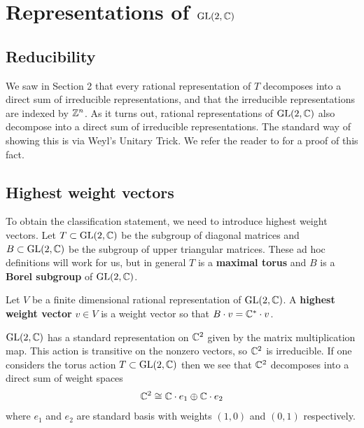 \documentclass[12pt]{article}
\begin{document}
\section{Representations of $\operatorname{GL}(2,\mathbb{C})$}

\subsection{Reducibility}
We saw in Section 2 that every rational representation of $T$ decomposes into a direct sum of irreducible representations,
and that the irreducible representations are indexed by $\mathbb{Z}^n$. As it turns out, rational representations of $\operatorname{GL}(2,\mathbb{C})$
also decompose into a direct sum of irreducible representations. The standard way of showing this is via 
Weyl's Unitary Trick. We refer the reader to \cite{milne} for a proof of this fact.


\subsection{Highest weight vectors}
To obtain the classification statement, we need to introduce highest weight vectors.
Let $T\subset \operatorname{GL}(2,\mathbb{C})$ be the subgroup of diagonal matrices and $B \subset \operatorname{GL}(2,\mathbb{C})$ be the subgroup of upper triangular matrices.
These ad hoc definitions will work for us, but in general $T$ is a \textbf{maximal torus} and $B$ is a \textbf{Borel subgroup} of $\operatorname{GL}(2,\mathbb{C})$.
\begin{definition}
    Let $V$ be a finite dimensional rational representation of $\operatorname{GL}(2,\mathbb{C})$. A \textbf{highest weight vector} $v\in V$ is 
    a weight vector so that $B\cdot v = \mathbb{C}^*\cdot v$. 
\end{definition}



\begin{example}
$\operatorname{GL}(2,\mathbb{C})$ has a standard representation on $\mathbb{C}^2$ given by the matrix multiplication map. This action
is transitive on the nonzero vectors, so $\mathbb{C}^2$ is irreducible. If one considers the torus action $T\subset \operatorname{GL}(2,\mathbb{C})$
then we see that $\mathbb{C}^2$ decomposes into a direct sum of weight spaces \begin{align*}
    \mathbb{C}^2 \cong \mathbb{C}\cdot e_1 \oplus \mathbb{C}\cdot e_2
\end{align*} where $e_1$ and $e_2$ are standard basis with weights $(1,0)$ and $(0,1)$ respectively.
\end{example}
\end{document}
